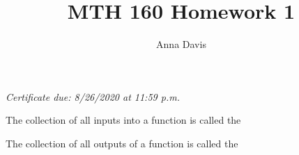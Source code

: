 \documentclass{ximera}
\author{Anna Davis} \title{MTH 160 Homework 1}
\begin{document}
\begin{abstract}

\end{abstract}
\maketitle
 \textit{Certificate due: 8/26/2020 at 11:59 p.m.}
\begin{problem}\label{prob:160hom1prob1}
The collection of all inputs into a function is called the
\begin{multipleChoice}  
\end{multipleChoice}  
\end{problem}

\begin{problem}\label{prob:160hom1prob2}
The collection of all outputs of a function is called the
\begin{multipleChoice}  
\end{multipleChoice}  
\end{problem}
\end{document}
